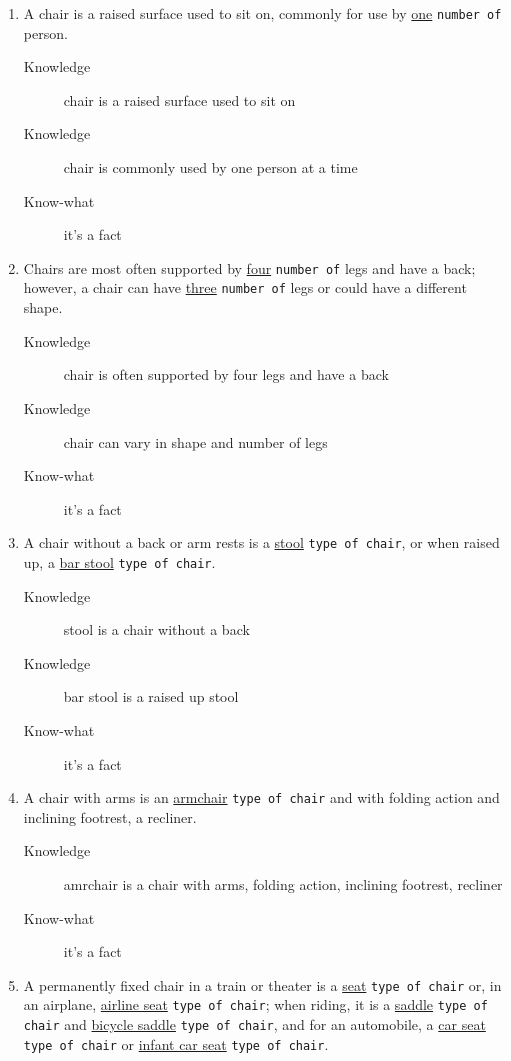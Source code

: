 \documentclass[a4paper,10pt,twoside,twocolumn]{article}
\begin{document}
\begin{enumerate}
\item A chair is a raised surface used to sit on, commonly for use by \uline{one} \texttt{number of} person.
\begin{description}
\item[{Knowledge}] chair is a raised surface used to sit on
\item[{Knowledge}] chair is commonly used by one person at a time
\item[{Know-what}] it's a fact
\end{description}
\item Chairs are most often supported by \uline{four} \texttt{number of} legs and have a back; however, a chair can have \uline{three} \texttt{number of} legs or could have a different shape.
\begin{description}
\item[{Knowledge}] chair is often supported by four legs and have a back
\item[{Knowledge}] chair can vary in shape and number of legs
\item[{Know-what}] it's a fact
\end{description}
\item A chair without a back or arm rests is a \uline{stool} \texttt{type of chair}, or when raised up, a \uline{bar stool} \texttt{type of chair}.
\begin{description}
\item[{Knowledge}] stool is a chair without a back
\item[{Knowledge}] bar stool is a raised up stool
\item[{Know-what}] it's a fact
\end{description}
\item A chair with arms is an \uline{armchair} \texttt{type of chair} and with folding action and inclining footrest, a recliner.
\begin{description}
\item[{Knowledge}] amrchair is a chair with arms, folding action, inclining footrest, recliner
\item[{Know-what}] it's a fact
\end{description}
\item A permanently fixed chair in a train or theater is a \uline{seat} \texttt{type of chair} or, in an airplane, \uline{airline seat} \texttt{type of chair}; when riding, it is a \uline{saddle} \texttt{type of chair} and \uline{bicycle saddle} \texttt{type of chair}, and for an automobile, a \uline{car seat} \texttt{type of chair} or \uline{infant car seat} \texttt{type of chair}.

\end{enumerate}
\end{document}
